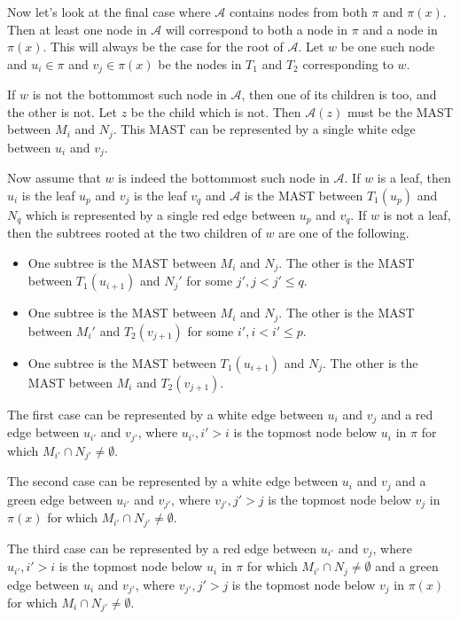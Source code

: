 Now let's look at the final case where $\mathcal{A}$ contains nodes from both $\pi$ and $\pi(x)$. Then at least one node in $\mathcal{A}$ will correspond to both a node in $\pi$ and a node in $\pi(x)$. This will always be the case for the root of $\mathcal{A}$. Let $w$ be one such node and $u_i \in \pi$ and $v_j \in \pi(x)$ be the nodes in $T_1$ and $T_2$ corresponding to $w$.

If $w$ is not the bottommost such node in $\mathcal{A}$, then one of its children is too, and the other is not. Let $z$ be the child which is not. Then $\mathcal{A}(z)$ must be the MAST between $M_i$ and $N_j$. This MAST can be represented by a single white edge between $u_i$ and $v_j$.

Now assume that $w$ is indeed the bottommost such node in $\mathcal{A}$. If $w$ is a leaf, then $u_i$ is the leaf $u_p$ and $v_j$ is the leaf $v_q$ and $\mathcal{A}$ is the MAST between $T_1(u_p)$ and $N_q$ which is represented by a single red edge between $u_p$ and $v_q$. If $w$ is not a leaf, then the subtrees rooted at the two children of $w$ are one of the following.

\begin{itemize}
	\item One subtree is the MAST between $M_i$ and $N_j$. The other is the MAST between $T_1(u_{i+1})$ and $N_j'$ for some $j', j < j' \le q$.
	\item One subtree is the MAST between $M_i$ and $N_j$. The other is the MAST between $M_i'$ and $T_2(v_{j+1})$ for some $i', i < i' \le p$.
	\item One subtree is the MAST between $T_1(u_{i+1})$ and $N_j$. The other is the MAST between $M_i$ and $T_2(v_{j+1})$.
\end{itemize}

The first case can be represented by a white edge between $u_i$ and $v_j$ and a red edge between $u_{i'}$ and $v_{j'}$, where $u_{i'}, i' > i$ is the topmost node below $u_i$ in $\pi$ for which $M_{i'} \cap N_{j'} \ne \emptyset$.

The second case can be represented by a white edge between $u_i$ and $v_j$ and a green edge between $u_{i'}$ and $v_{j'}$, where $v_{j'}, j' > j$ is the topmost node below $v_j$ in $\pi(x)$ for which $M_{i'} \cap N_{j'} \ne \emptyset$.

The third case can be represented by a red edge between $u_{i'}$ and $v_{j}$, where $u_{i'}, i' > i$ is the topmost node below $u_i$ in $\pi$ for which $M_{i'} \cap N_{j} \ne \emptyset$ and a green edge between $u_{i}$ and $v_{j'}$, where $v_{j'}, j' > j$ is the topmost node below $v_j$ in $\pi(x)$ for which $M_{i} \cap N_{j'} \ne \emptyset$.\\

